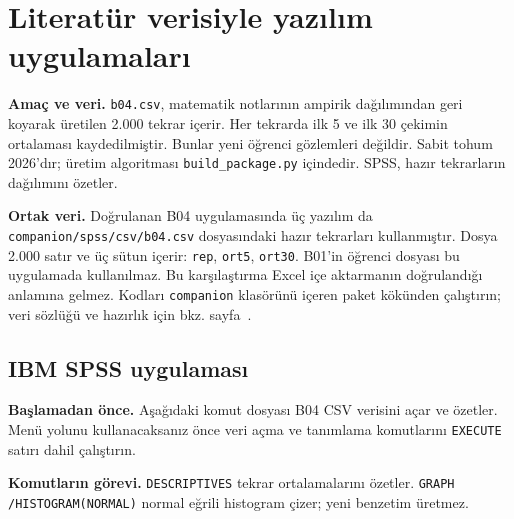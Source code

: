 \section{Literatür verisiyle yazılım uygulamaları}
\label{sec:spss-b04}

\textbf{Amaç ve veri.} \texttt{b04.csv}, \citet{cortez2008data} matematik
notlarının ampirik dağılımından geri koyarak üretilen 2.000 tekrar içerir.
Her tekrarda ilk 5 ve ilk 30 çekimin ortalaması kaydedilmiştir. Bunlar yeni
öğrenci gözlemleri değildir. Sabit tohum 2026'dır; üretim algoritması
\texttt{build\_package.py} içindedir. SPSS, hazır tekrarların dağılımını özetler.


\textbf{Ortak veri.} Doğrulanan B04 uygulamasında üç yazılım da
\nolinkurl{companion/spss/csv/b04.csv} dosyasındaki hazır tekrarları
kullanmıştır. Dosya 2.000 satır ve üç sütun içerir: \texttt{rep},
\texttt{ort5}, \texttt{ort30}. B01'in öğrenci dosyası bu uygulamada
kullanılmaz. Bu karşılaştırma Excel içe aktarmanın doğrulandığı anlamına
gelmez. Kodları \texttt{companion} klasörünü içeren paket kökünden
çalıştırın; veri sözlüğü ve hazırlık için bkz. sayfa~\pageref{sec:spss-guide}.

\subsection{IBM SPSS uygulaması}
\textbf{Başlamadan önce.} Aşağıdaki komut dosyası B04 CSV verisini
açar ve özetler. Menü yolunu kullanacaksanız önce veri açma ve tanımlama
komutlarını \texttt{EXECUTE} satırı dahil çalıştırın.

\begin{spssadimlar}
\end{spssadimlar}

{\raggedright
\noindent\textbf{Komutların görevi.} \texttt{DESCRIPTIVES} tekrar ortalamalarını özetler. \texttt{GRAPH /HISTOGRAM(NORMAL)} normal eğrili histogram çizer; yeni benzetim üretmez.\par}

